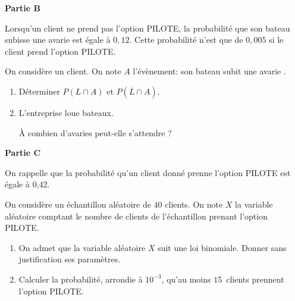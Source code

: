 \medskip

\textbf{Partie B}

\medskip
Lorsqu'un client ne prend pas l'option PILOTE, la probabilité que son bateau subisse une avarie est égale à $0,12$. Cette probabilité n'est que de $0,005$ si le client prend l'option PILOTE.

On considère un client. On note $A$ l'évènement: \og son bateau subit une avarie \fg.

\medskip

\begin{enumerate}
\item Déterminer $P(L \cap A)$ et $P\left(\overline{L} \cap A\right)$.
\item L'entreprise loue  bateaux.

À combien d'avaries peut-elle s'attendre ?
\end{enumerate}

\medskip

\textbf{Partie C}

\medskip
On rappelle que la probabilité qu'un client donné prenne l'option PILOTE est égale à 0,42.

On considère un échantillon aléatoire de $40$ clients. On note $X$ la variable aléatoire comptant le nombre de clients de l'échantillon prenant l'option PILOTE.

\medskip

\begin{enumerate}
\item On admet que la variable aléatoire $X$ suit une loi binomiale. Donner sans justification ses paramètres.
\item Calculer la probabilité, arrondie à $10^{-3}$, qu'au moins $1$5~clients prennent l'option PILOTE.
\end{enumerate}

\bigskip
